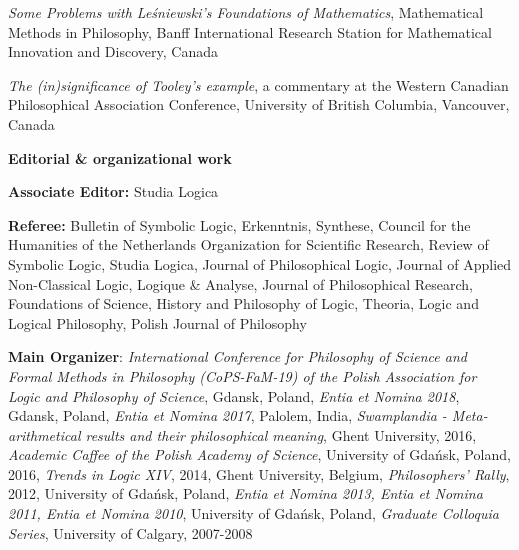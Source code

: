 \documentclass[10pt, a4paper]{article}
\newcommand{\years}[1]{\marginnote{\normalsize #1}}
\begin{document}
\vspace{0.5mm}


 \emph{Some Problems with Le\'sniewski's Foundations of Mathematics},  Mathematical  Methods in Philosophy,  Banff
International Research Station for Mathematical Innovation and Discovery, Canada


\vspace{0.5mm}


\years{2006} \emph{The (in)significance of Tooley's example}, a commentary at the   Western Canadian Philosophical Association Conference,  University of British Columbia, Vancouver, Canada


\vspace{0.5mm}



\vspace{2mm}

\large {\sc \textbf{Editorial \& organizational work}}\normalsize \hspace{5mm}


\normalsize


\textbf{Associate Editor:} Studia Logica

\textbf{Referee:} Bulletin of Symbolic Logic, Erkenntnis,  Synthese, Council for the Humanities of the Netherlands Organization for Scientific Research, Review of Symbolic Logic,  Studia Logica,  Journal of Philosophical Logic, Journal of Applied Non-Classical Logic,  Logique \& Analyse,   Journal of Philosophical Research,  Foundations of Science,  History and Philosophy of Logic, Theoria, Logic and Logical Philosophy, Polish Journal of Philosophy



\textbf{Main Organizer}: \emph{International Conference for Philosophy of Science and Formal Methods in Philosophy (CoPS-FaM-19) of the Polish Association for Logic and Philosophy of Science}, Gdansk, Poland, \emph{Entia et Nomina 2018}, Gdansk, Poland,  \emph{Entia et Nomina 2017}, Palolem, India, \emph{Swamplandia - Meta-arithmetical results and their philosophical meaning}, Ghent University, 2016, \emph{Academic Caffee of the Polish Academy of Science}, University of Gda{\'n}sk, Poland, 2016, \emph{Trends in Logic XIV}, 2014, Ghent University, Belgium, \emph{Philosophers' Rally}, 2012, University of Gda\' nsk, Poland, \emph{Entia et Nomina 2013, Entia et Nomina 2011, Entia et Nomina 2010}, University of Gda{\'n}sk, Poland,  \emph{Graduate Colloquia Series}, University of Calgary, 2007-2008





%


%
\end{document}
